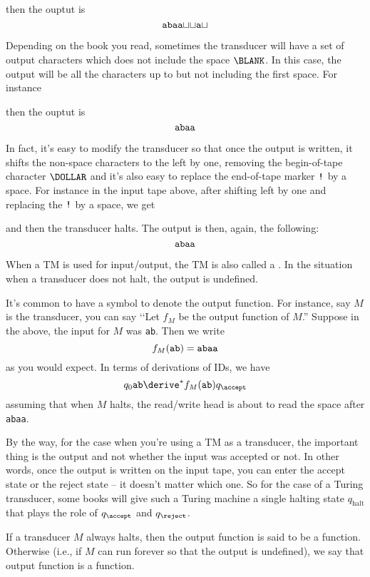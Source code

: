 

then the ouptut is
\[
\text{\texttt{abaa}$\sqcup\sqcup$\texttt{a}$\sqcup$}
\]


Depending on the book you read,
sometimes the transducer will have a set of output characters which does not
include the space $\BLANK$.
In this case, the output will be all the characters up to but not including
the first space.
For instance



then the ouptut is
\[
\text{\texttt{abaa}}
\]

In fact, it's easy to modify the transducer so that once the output is written,
it shifts the non-space characters to the left by one, removing the
begin-of-tape character $\DOLLAR$
and it's also easy to replace the end-of-tape marker $\operatorname{\text{\texttt{!}}}$ by a space.
For instance in the input tape above, after shifting left by one and
replacing the $\operatorname{\text{\texttt{!}}}$ by a space,
we get



and then the transducer halts.
The output is then, again, the following:
\[
\text{\texttt{abaa}}
\]

When a TM is used for input/output, the TM is also called a
.
In the situation when a transducer does not halt, the output
is undefined.

It's common to have a symbol to denote the output function.
For instance, say $M$ is the transducer,
you can say \lq\lq Let $f_M$ be the output function of $M$.''
Suppose in the above, the input for $M$ was \texttt{ab}.
Then we write
\[
f_M(\text{\texttt{ab}}) = \text{\texttt{abaa}}
\]
as you would expect.
In terms of derivations of IDs, we have
\[
q_0 \text{\texttt{ab}} \derive^* f_M(\text{\texttt{ab}})q_\accept 
\]
assuming that when $M$ halts, the read/write head is about to read
the space after \texttt{abaa}.

By the way, for the case when you're using a TM as a transducer,
the important thing is the output and not whether the input was accepted or
not.
In other words, once the output is written on the input tape, you can
enter the accept state or the reject state -- it doesn't matter which one.
So for the case of a Turing transducer, some books will give such a
Turing machine a single halting state $q_{\text{halt}}$ that plays the role of
$q_\accept$ and $q_\reject$.

If a transducer $M$ always halts, then the output function is said to be
a  function.
Otherwise (i.e., if $M$ can run forever so that  the output is undefined),
we say that output function is a  function.





